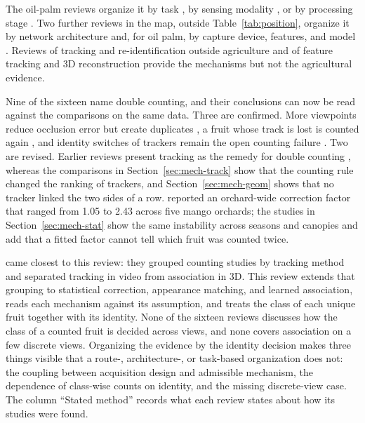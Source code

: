 The oil-palm reviews organize it by task \citep{khan2021oil}, by sensing modality \citep{lai2023oil,goh2025fresh}, or by processing stage \citep{kamal2024machine}. Two further reviews in the map, outside Table~\ref{tab:position}, organize it by network architecture \citep{pugazhendi2026advances} and, for oil palm, by capture device, features, and model \citep{naghipour2024review}. Reviews of tracking and re-identification outside agriculture \citep{luo2021multiple,ye2022deep} and of feature tracking and 3D reconstruction \citep{cao2018survey,li2025reviewb} provide the mechanisms but not the agricultural evidence.

Nine of the sixteen name double counting, and their conclusions can now be read against the comparisons on the same data. Three are confirmed. More viewpoints reduce occlusion error but create duplicates \citep{anderson2021technologies,he2022fruit,koirala2019deepb}, a fruit whose track is lost is counted again \citep{koirala2019deepb}, and identity switches of trackers remain the open counting failure \citep{liu2026shaping,rong2026research}. Two are revised. Earlier reviews present tracking as the remedy for double counting \citep{he2022fruit,miranda2023fruit,rong2026research}, whereas the comparisons in Section~\ref{sec:mech-track} show that the counting rule changed the ranking of trackers, and Section~\ref{sec:mech-geom} shows that no tracker linked the two sides of a row. \citet{koirala2019deepb} reported an orchard-wide correction factor that ranged from 1.05 to 2.43 across five mango orchards; the studies in Section~\ref{sec:mech-stat} show the same instability across seasons and canopies and add that a fitted factor cannot tell which fruit was counted twice.

\citet{miranda2023fruit} came closest to this review: they grouped counting studies by tracking method and separated tracking in video from association in 3D. This review extends that grouping to statistical correction, appearance matching, and learned association, reads each mechanism against its assumption, and treats the class of each unique fruit together with its identity. None of the sixteen reviews discusses how the class of a counted fruit is decided across views, and none covers association on a few discrete views. Organizing the evidence by the identity decision makes three things visible that a route-, architecture-, or task-based organization does not: the coupling between acquisition design and admissible mechanism, the dependence of class-wise counts on identity, and the missing discrete-view case. The column ``Stated method'' records what each review states about how its studies were found.

